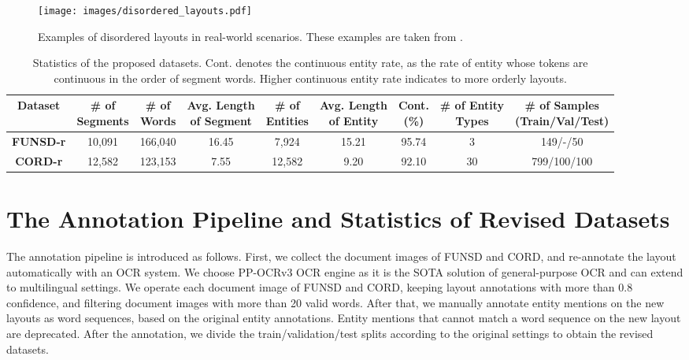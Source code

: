 \documentclass[11pt]{article}
\begin{document}
\begin{figure*}[t]
    \centering
\texttt{[image: images/disordered\_layouts.pdf]}        
    \caption{
        Examples of disordered layouts in real-world scenarios. These examples are taken from \citep{yu2023icdar}. }
\label{fig:disorder_examples}
\end{figure*}

\renewcommand\tabcolsep{5pt}
\begin{table*}[t]
\centering
\small
\begin{spacing}{1.19}
\begin{tabular}{c|ccc|ccc|cc}
    \bottomrule
    \textbf{Dataset} & 
    \bfseries\makecell[c]{\# of\\Segments} & 
    \bfseries\makecell[c]{\# of\\Words} & 
    \bfseries\makecell[c]{Avg. Length\\of Segment} & 
    \bfseries\makecell[c]{\# of\\Entities} & 
    \bfseries\makecell[c]{Avg. Length\\of Entity} & 
    \bfseries\makecell[c]{Cont.\\(\%)} & 
    \bfseries\makecell[c]{\# of Entity\\Types} & 
    \bfseries\makecell[c]{\# of Samples\\(Train/Val/Test)} \\
    \hline
    \textbf{FUNSD-r} & 10,091 & 166,040 & 16.45 & 7,924 & 15.21 & 95.74 & 3 & 149/-/50 \\
    \textbf{CORD-r} & 12,582 & 123,153 & 7.55 & 12,582 & 9.20 & 92.10 & 30 & 799/100/100 \\
    \toprule
\end{tabular}
\end{spacing}
\caption{Statistics of the proposed datasets. Cont. denotes the continuous entity rate, as the rate of entity whose tokens are continuous in the order of segment words. Higher continuous entity rate indicates to more orderly layouts. }
\label{tab:stat}
\end{table*}

\appendix

\section{The Annotation Pipeline and Statistics of Revised Datasets}
\label{sec:dataset_detail}

The annotation pipeline is introduced as follows. 
First, we collect the document images of FUNSD and CORD, and re-annotate the layout automatically with an OCR system. We choose PP-OCRv3 \citep{li2022pp} OCR engine as it is the SOTA solution of general-purpose OCR and can extend to multilingual settings. 
We operate each document image of FUNSD and CORD, keeping layout annotations with more than 0.8 confidence, and filtering document images with more than 20 valid words. 
After that, we manually annotate entity mentions on the new layouts as word sequences, based on the original entity annotations. Entity mentions that cannot match a word sequence on the new layout are deprecated. 
After the annotation, we divide the train/validation/test splits according to the original settings to obtain the revised datasets. 
\end{document}
